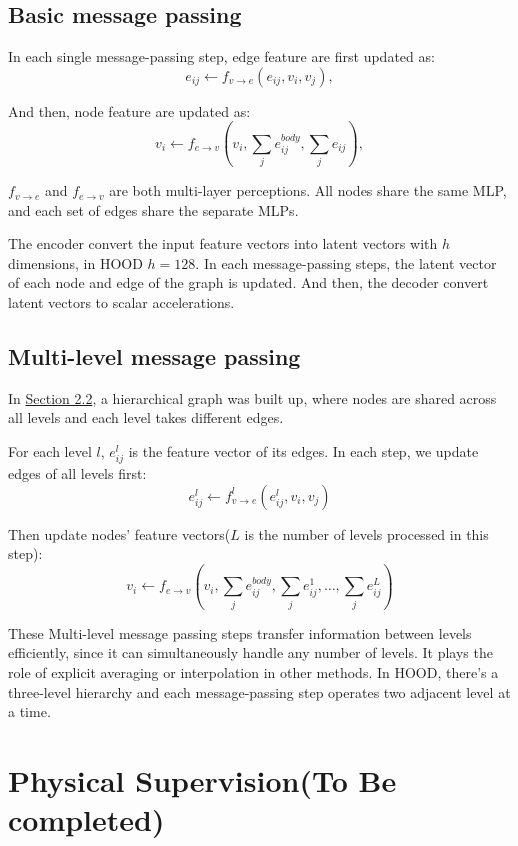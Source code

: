 \documentclass{article}
\begin{document}
\subsection{Basic message passing}
\par In each single message-passing step, edge feature are first updated as:
$$
e_{ij} \gets f_{v \rightarrow e}(e_{ij},v_{i},v_{j}) ,
$$
\par And then, node feature are updated as:
$$
v_i \gets f_{e \rightarrow v}(v_i,\sum_{j}e_{ij}^{body},\sum_{j}e_{ij}) , 
$$
\par $f_{v \rightarrow e}$ and $f_{e \rightarrow v}$ are both multi-layer perceptions. All nodes share the same MLP, and each set of edges share the separate MLPs.
\par The encoder convert the input feature vectors into latent vectors with $h$ dimensions, in HOOD $h = 128$. In each message-passing steps, the latent vector of each node and edge of the graph is updated. And then, the decoder convert latent vectors to scalar accelerations.
\subsection{Multi-level message passing}
\par In \href{subsection.2.2}{Section 2.2}, a hierarchical graph was built up, where nodes are shared across all levels and each level takes different edges.
\par For each level $l$, $e_{ij}^{l}$ is the feature vector of its edges. In each step, we update edges of all levels first:
$$
e_{ij}^{l} \gets f_{v \rightarrow e}^{l}(e_{ij}^{l},v_i,v_j)
$$
\par Then update nodes' feature vectors($L$ is the number of levels processed in this step):
$$
v_i \gets f_{e \rightarrow v}(v_i,\sum_{j}e_{ij}^{body},\sum_{j}e_{ij}^1,\dots,\sum_{j}e_{ij}^{L})
$$
\par These Multi-level message passing steps transfer information between levels efficiently, since it can simultaneously handle any number of levels. It plays the role of explicit averaging or interpolation in other methods. In HOOD, there's a three-level hierarchy and each message-passing step operates two adjacent level at a time.
\section{Physical Supervision(To Be completed)}
\end{document}
